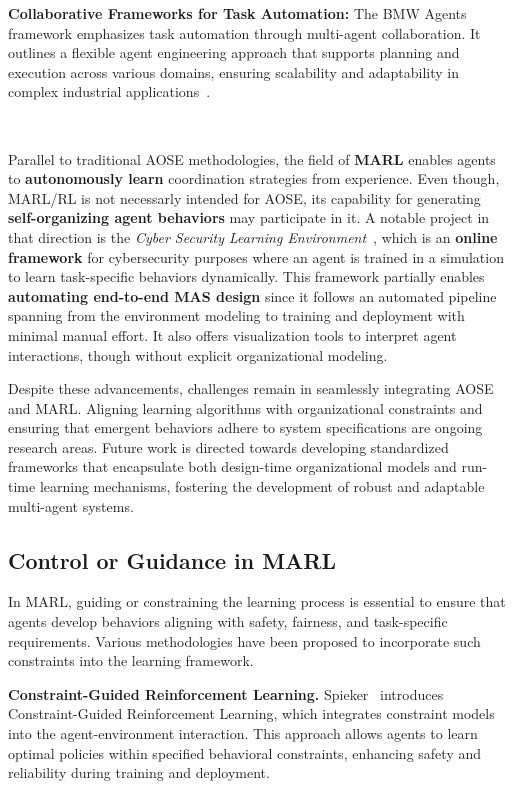\documentclass[pdflatex,sn-mathphys-num]{sn-jnl}%
\theoremstyle{thmstyleone}%
\theoremstyle{thmstyletwo}%
\theoremstyle{thmstylethree}%
\begin{document}
\textbf{Collaborative Frameworks for Task Automation:} The BMW Agents framework emphasizes task automation through multi-agent collaboration. It outlines a flexible agent engineering approach that supports planning and execution across various domains, ensuring scalability and adaptability in complex industrial applications~\cite{crawford2024bmw}.

\

Parallel to traditional AOSE methodologies, the field of \textbf{MARL} enables agents to \textbf{autonomously learn} coordination strategies from experience. Even though, MARL/RL is not necessarly intended for AOSE, its capability for generating \textbf{self-organizing agent behaviors} may participate in it.
A notable project in that direction is the \textit{Cyber Security Learning Environment}~\cite{hammar2023scalable}, which is an \textbf{online framework} for cybersecurity purposes where an agent is trained in a simulation to learn task-specific behaviors dynamically. This framework partially enables \textbf{automating end-to-end MAS design} since it follows an automated pipeline spanning from the environment modeling to training and deployment with minimal manual effort. It also offers visualization tools to interpret agent interactions, though without explicit organizational modeling.

Despite these advancements, challenges remain in seamlessly integrating AOSE and MARL. Aligning learning algorithms with organizational constraints and ensuring that emergent behaviors adhere to system specifications are ongoing research areas. Future work is directed towards developing standardized frameworks that encapsulate both design-time organizational models and run-time learning mechanisms, fostering the development of robust and adaptable multi-agent systems.


\subsection{Control or Guidance in MARL}\label{sub-sec:rel_control}

In MARL, guiding or constraining the learning process is essential to ensure that agents develop behaviors aligning with safety, fairness, and task-specific requirements. Various methodologies have been proposed to incorporate such constraints into the learning framework.

\textbf{Constraint-Guided Reinforcement Learning.} Spieker~\cite{spieker2021constraint} introduces Constraint-Guided Reinforcement Learning, which integrates constraint models into the agent-environment interaction. This approach allows agents to learn optimal policies within specified behavioral constraints, enhancing safety and reliability during training and deployment.
\end{document}
